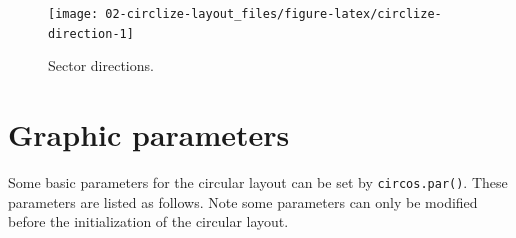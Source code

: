 \documentclass[]{book}
\theoremstyle{definition}
\theoremstyle{definition}
\theoremstyle{remark}
\begin{document}
\begin{figure}

{\centering \texttt{[image: 02-circlize-layout\_files/figure-latex/circlize-direction-1]} 

}

\caption{Sector directions.}\label{fig:circlize-direction}
\end{figure}

\section{Graphic parameters}\label{graphic-parameters}

Some basic parameters for the circular layout can be set by
\texttt{circos.par()}. These parameters are listed as follows. Note some
parameters can only be modified before the initialization of the
circular layout.
\end{document}
